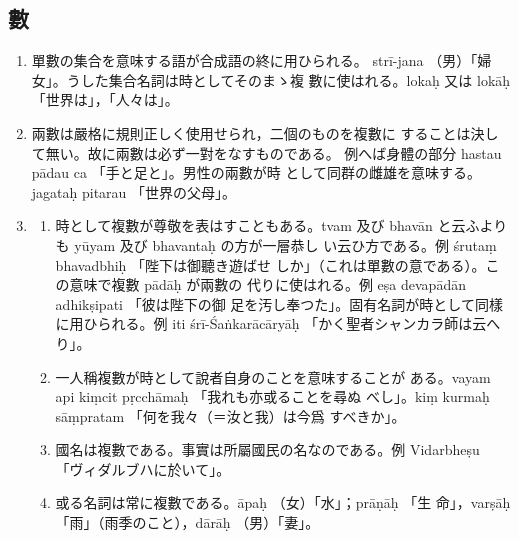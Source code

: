 \subsection{數}
\numberParagraph \label{np:218}
\begin{enumerate}[label=(\arabic*)]
\item 單數の集合を意味する語が合成語の終に用ひられる。
strī-jana （男）「婦女」。うした集合名詞は時としてそのまゝ複
數に使はれる。lokaḥ 又は lokāḥ 「世界は」，「人々は」。
\item 兩數は嚴格に規則正しく使用せられ，二個のものを複數に
することは決して無い。故に兩數は必ず一對をなすものである。
例へば身體の部分 hastau pādau ca 「手と足と」。男性の兩數が時
として同群の雌雄を意味する。jagataḥ pitarau 「世界の父母」。
\item \label{item:2183}
\begin{enumerate}[label=(\alph*), ref=\alph*]
\item \label{item:2183a} 時として複數が尊敬を表はすこともある。tvam 及び
bhavān と云ふよりも yūyam 及び bhavantaḥ の方が一層恭し
い云ひ方である。例 śrutaṃ bhavadbhiḥ 「陛下は御聽き遊ばせ
しか」（これは單數の意である）。この意味で複數 pādāḥ が兩數の
代りに使はれる。例 eṣa devapādān adhikṣipati 「彼は陛下の御
足を汚し奉つた」。固有名詞が時として同樣に用ひられる。例 iti
śrī-Śaṅkarācāryāḥ 「かく聖者シャンカラ師は云へり」。
\item 一人稱複數が時として說者自身のことを意味することが
ある。vayam api kiṃcit pṛcchāmaḥ 「我れも亦或ることを尋ぬ
べし」。kiṃ kurmaḥ sāṃpratam 「何を我々（＝汝と我）は今爲
すべきか」。
\item 國名は複數である。事實は所屬國民の名なのである。例
Vidarbheṣu 「ヴィダルブハに於いて」。
\item 或る名詞は常に複數である。āpaḥ （女）「水」；prāṇāḥ 「生
命」，varṣāḥ 「雨」（雨季のこと），dārāḥ （男）「妻」。
\end{enumerate}
\end{enumerate}


